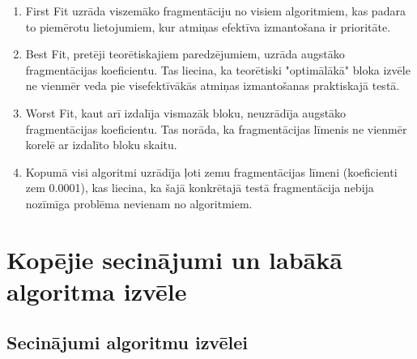 \documentclass{report}
\begin{document}
	\begin{enumerate}
		\item First Fit uzrāda viszemāko fragmentāciju no visiem algoritmiem, kas padara to piemērotu lietojumiem, kur atmiņas efektīva izmantošana ir prioritāte.
		
		\item Best Fit, pretēji teorētiskajiem paredzējumiem, uzrāda augstāko fragmentācijas koeficientu. Tas liecina, ka teorētiski "optimālākā" bloka izvēle ne vienmēr veda pie visefektīvākās atmiņas izmantošanas praktiskajā testā.
		
		\item Worst Fit, kaut arī izdalīja vismazāk bloku, neuzrādīja augstāko fragmentācijas koeficientu. Tas norāda, ka fragmentācijas līmenis ne vienmēr korelē ar izdalīto bloku skaitu.
		
		\item Kopumā visi algoritmi uzrādīja ļoti zemu fragmentācijas līmeni (koeficienti zem 0.0001), kas liecina, ka šajā konkrētajā testā fragmentācija nebija nozīmīga problēma nevienam no algoritmiem.
	\end{enumerate}
	
	\section{Kopējie secinājumi un labākā algoritma izvēle}
	
	\subsection{Secinājumi algoritmu izvēlei}
	
\end{document}
